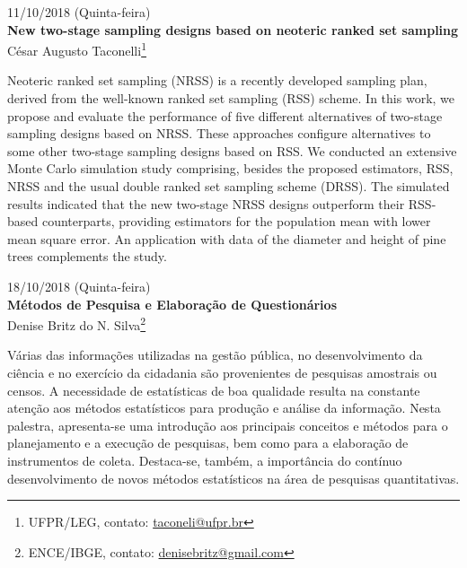 \documentclass[9pt, a5paper]{article}
\begin{document}
\begin{center}
  {\footnotesize 11/10/2018 (Quinta-feira)}\\
  \textbf{\large
    New two-stage sampling designs based on neoteric ranked set
    sampling}\\
  César Augusto Taconelli\footnote{UFPR/LEG, contato:
    \url{taconeli@ufpr.br}}
\end{center}

Neoteric ranked set sampling (NRSS) is a recently developed sampling
plan, derived from the well-known ranked set sampling (RSS) scheme. In
this work, we propose and evaluate the performance of five different
alternatives of two-stage sampling designs based on NRSS. These
approaches configure alternatives to some other two-stage sampling
designs based on RSS. We conducted an extensive Monte Carlo simulation
study comprising, besides the proposed estimators, RSS, NRSS and the
usual double ranked set sampling scheme (DRSS). The simulated results
indicated that the new two-stage NRSS designs outperform their RSS-based
counterparts, providing estimators for the population mean with lower
mean square error. An application with data of the diameter and height
of pine trees complements the study.

\clearpage


\begin{center}
  {\footnotesize 18/10/2018 (Quinta-feira)}\\
  \textbf{\large
  Métodos de Pesquisa e Elaboração de Questionários}\\
  Denise Britz do N. Silva\footnote{ENCE/IBGE, contato:
    \url{denisebritz@gmail.com}}
\end{center}

Várias das informações utilizadas na gestão pública, no desenvolvimento
da ciência e no exercício da cidadania são provenientes de pesquisas
amostrais ou censos. A necessidade de estatísticas de boa qualidade
resulta na constante atenção aos métodos estatísticos para produção e
análise da informação. Nesta palestra, apresenta-se uma introdução aos
principais conceitos e métodos para o planejamento e a execução de
pesquisas, bem como para a elaboração de instrumentos de
coleta. Destaca-se, também, a importância do contínuo desenvolvimento de
novos métodos estatísticos na área de pesquisas quantitativas.

\clearpage
\end{document}
